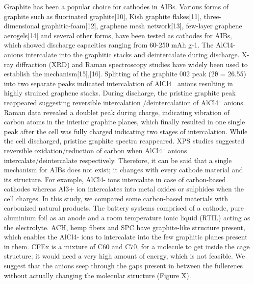 \documentclass{article}
\begin{document}
Graphite has been a popular choice for cathodes in AIBs. Various forms of graphite such as fluorinated graphite[10], Kish graphite flakes[11], three-dimensional graphitic-foam[12], graphene mesh network[13], few-layer graphene aerogels[14] and several other forms, have been tested as cathodes for AIBs, which showed discharge capacities ranging from 60-250 mAh g-1. The AlCl4- anions intercalate into the graphitic stacks and deintercalate during discharge. X-ray diffraction (XRD) and Raman spectroscopy studies have widely been used to establish the mechanism[15],[16]. Splitting of the graphite 002 peak (2θ = 26.55) into two separate peaks indicated intercalation of AlCl4¯ anions resulting in highly strained graphene stacks.  During discharge, the pristine graphite peak reappeared suggesting reversible intercalation /deintercalation of AlCl4¯ anions. Raman data revealed a doublet peak during charge, indicating vibration of carbon atoms in the interior graphite planes, which finally resulted in one single peak after the cell was fully charged indicating two stages of intercalation. While the cell discharged, pristine graphite spectra reappeared. XPS studies suggested reversible oxidation/reduction of carbon when AlCl4¯ anions intercalate/deintercalate respectively. Therefore, it can be said that a single mechanism for AIBs does not exist; it changes with every cathode material and its structure. For example, AlCl4- ions intercalate in case of carbon-based cathodes whereas Al3+ ion intercalates into metal oxides or sulphides when the cell charges.
In this study, we compared some carbon-based materials with carbonized natural products. The battery systems comprised of a cathode, pure aluminium foil as an anode and a room temperature ionic liquid (RTIL) acting as the electrolyte. ACH, hemp fibers and SPC have graphite-like structure present, which enables the AlCl4- ions to intercalate into the few graphitic planes present in them. CFEx is a mixture of C60 and C70, for a molecule to get inside the cage structure; it would need a very high amount of energy, which is not feasible. We suggest that the anions seep through the gaps present in between the fullerenes without actually changing the molecular structure (Figure X). 
\end{document}
